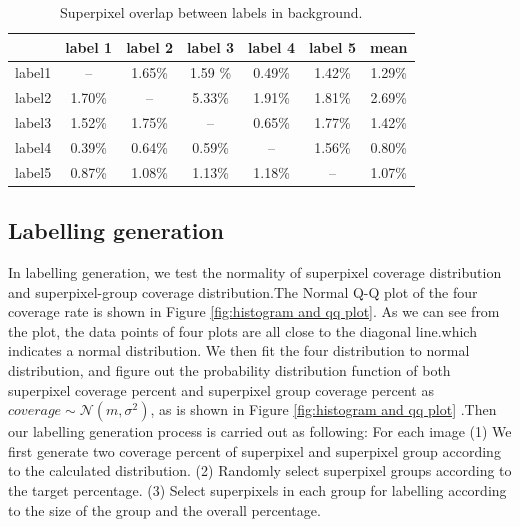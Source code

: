 \documentclass[runningheads,a4paper]{llncs}
\begin{document}
\begin{table}[!tb]
\centering
\caption{Superpixel overlap between labels in background.}
\begin{tabular}{|c|c|c|c|c|c|c|}
\hline
 & label 1 & label 2&label 3&label 4&label 5&mean\\
\hline
label1& -- & 1.65\% & 1.59	\%& 0.49\%& 1.42\%& 1.29\%\\
\hline
label2& 1.70\% & -- & 5.33\%& 1.91\%& 1.81\%& 2.69\% \\
\hline
label3& 1.52\% & 1.75\% & --& 0.65\%& 1.77\%& 1.42\% \\
\hline
label4& 0.39\% & 0.64\% & 0.59\%& --& 1.56\%& 0.80\%\\
\hline
label5& 0.87\% & 1.08\% & 1.13\%& 1.18\%& --& 1.07\% \\
\hline
\end{tabular}
\label{ta: sp overlap b}
\end{table}


\subsection{Labelling generation}
In labelling generation, we test the normality of superpixel coverage distribution and superpixel-group coverage distribution.The Normal Q-Q plot of the four coverage rate is shown in Figure \ref{fig:histogram and qq plot}. As we can see from the plot, the data points of four plots are all close to the diagonal line.which indicates a normal distribution. We then fit the four distribution to normal distribution, and figure out the probability distribution function of both superpixel coverage percent and superpixel group coverage percent as $coverage \sim \mathcal{N} (m,\sigma^2)$, as is shown in Figure \ref{fig:histogram and qq plot} .Then our labelling generation process is carried out as following: For each image (1) We first generate two coverage percent of superpixel and superpixel group according to the calculated  distribution. (2) Randomly select superpixel groups according to the target percentage. (3) Select superpixels in each group for labelling according to the size of the group and the overall percentage.
\end{document}
